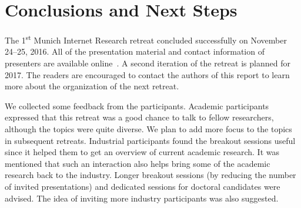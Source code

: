 \section{Conclusions and Next Steps}\label{sec:conclusion}

The 1\textsuperscript{st} Munich Internet Research retreat concluded
successfully on November 24--25, 2016. All
of the presentation material and contact information of presenters are
available online~\cite{mir-materials}. A second iteration of the retreat is
planned for 2017.  The readers are encouraged to contact the authors of this
report to learn more about the organization of the next retreat.

We collected some feedback from the participants. Academic participants
expressed that this retreat was a good chance to talk to fellow researchers,
although the topics were quite diverse. We plan to add more focus to the
topics in subsequent retreats. Industrial participants found the breakout
sessions useful since it helped them to get an overview of current academic
research. It was mentioned that such an interaction also helps bring some of
the academic research back to the industry. Longer breakout sessions (by
reducing the number of invited presentations) and dedicated sessions for
doctoral candidates were advised. The idea of inviting more industry
participants was also suggested.






